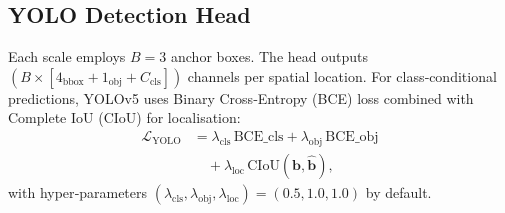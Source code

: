\documentclass[12pt,a4paper]{article}
\begin{document}
\subsection{YOLO Detection Head}
Each scale employs $B=3$ anchor boxes. The head outputs $(B \times [4_\text{bbox}+1_\text{obj}+C_\text{cls}])$ channels per spatial location. For class‑conditional predictions, YOLOv5 uses Binary Cross‑Entropy (BCE) loss combined with Complete IoU (CIoU) for localisation:
\begin{align}
  \mathcal{L}_{\text{YOLO}} &= \lambda_{\text{cls}} \, \mathrm{BCE}\_{\text{cls}} + \lambda_{\text{obj}}\, \mathrm{BCE}\_{\text{obj}} \\
  &\quad + \lambda_{\text{loc}}\, \mathrm{CIoU}(\mathbf{b},\hat{\mathbf{b}}),
\end{align}
with hyper‑parameters $(\lambda_{\text{cls}},\lambda_{\text{obj}},\lambda_{\text{loc}})=(0.5,1.0,1.0)$ by default.

\end{document}
